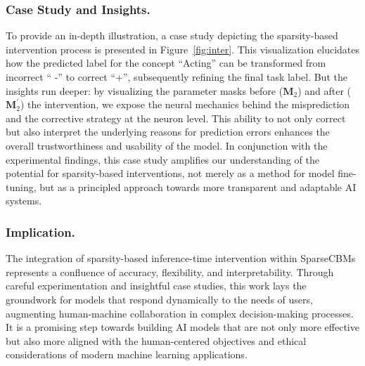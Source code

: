 \documentclass[letterpaper]{article} %
\begin{document}
\subsubsection{Case Study and Insights.}
To provide an in-depth illustration, a case study depicting the sparsity-based intervention process is presented in Figure~\ref{fig:inter}. This visualization elucidates how the predicted label for the concept ``Acting'' can be transformed from incorrect `` -'' to correct ``+'', subsequently refining the final task label. But the insights run deeper: by visualizing the parameter masks before ($\bm{M}_2$) and after ($\bm{M}_2^\prime$) the intervention, we expose the neural mechanics behind the misprediction and the corrective strategy at the neuron level.
This ability to not only correct but also interpret the underlying reasons for prediction errors enhances the overall trustworthiness and usability of the model. In conjunction with the experimental findings, this case study amplifies our understanding of the potential for sparsity-based interventions, not merely as a method for model fine-tuning, but as a principled approach towards more transparent and adaptable AI systems.

\subsubsection{Implication.}
The integration of sparsity-based inference-time intervention within SparseCBMs represents a confluence of accuracy, flexibility, and interpretability. Through careful experimentation and insightful case studies, this work lays the groundwork for models that respond dynamically to the needs of users, augmenting human-machine collaboration in complex decision-making processes. It is a promising step towards building AI models that are not only more effective but also more aligned with the human-centered objectives and ethical considerations of modern machine learning applications.
\end{document}
